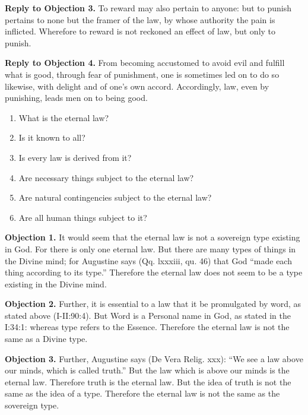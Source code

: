 \textbf{Reply to Objection 3.} To reward may also pertain to anyone: but to punish pertains to none but the framer of the law, by whose authority the pain is inflicted. Wherefore to reward is not reckoned an effect of law, but only to punish.

\textbf{Reply to Objection 4.} From becoming accustomed to avoid evil and fulfill what is good, through fear of punishment, one is sometimes led on to do so likewise, with delight and of one's own accord. Accordingly, law, even by punishing, leads men on to being good.




\begin{enumerate}

\item  What is the eternal law? 
\item  Is it known to all? 
\item  Is every law is derived from it? 
\item  Are necessary things subject to the eternal law? 
\item  Are natural contingencies subject to the eternal law? 
\item  Are all human things subject to it? 
\end{enumerate}


\textbf{Objection 1.} It would seem that the eternal law is not a sovereign type existing in God. For there is only one eternal law. But there are many types of things in the Divine mind; for Augustine says (Qq. lxxxiii, qu. 46) that God ``made each thing according to its type.'' Therefore the eternal law does not seem to be a type existing in the Divine mind.

\textbf{Objection 2.} Further, it is essential to a law that it be promulgated by word, as stated above (I-II:90:4). But Word is a Personal name in God, as stated in the I:34:1: whereas type refers to the Essence. Therefore the eternal law is not the same as a Divine type.

\textbf{Objection 3.} Further, Augustine says (De Vera Relig. xxx): ``We see a law above our minds, which is called truth.'' But the law which is above our minds is the eternal law. Therefore truth is the eternal law. But the idea of truth is not the same as the idea of a type. Therefore the eternal law is not the same as the sovereign type.

